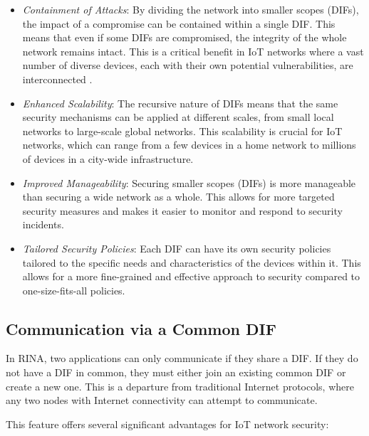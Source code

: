 \documentclass{ieeeaccess}
\begin{document}
\begin{itemize}
	\item \textit{Containment of Attacks}: By dividing the network into smaller scopes (DIFs), the impact of a compromise can be contained within a single DIF. This means that even if some DIFs are compromised, the integrity of the whole network remains intact. This is a critical benefit in IoT networks where a vast number of diverse devices, each with their own potential vulnerabilities, are interconnected \cite{day2008networking}.
	\item \textit{Enhanced Scalability}: The recursive nature of DIFs means that the same security mechanisms can be applied at different scales, from small local networks to large-scale global networks. This scalability is crucial for IoT networks, which can range from a few devices in a home network to millions of devices in a city-wide infrastructure.
	\item \textit{Improved Manageability}: Securing smaller scopes (DIFs) is more manageable than securing a wide network as a whole. This allows for more targeted security measures and makes it easier to monitor and respond to security incidents.
	\item \textit{Tailored Security Policies}: Each DIF can have its own security policies tailored to the specific needs and characteristics of the devices within it. This allows for a more fine-grained and effective approach to security compared to one-size-fits-all policies.
\end{itemize}

\subsection{Communication via a Common DIF}
In RINA, two applications can only communicate if they share a DIF. If they do not have a DIF in common, they must either join an existing common DIF or create a new one. This is a departure from traditional Internet protocols, where any two nodes with Internet connectivity can attempt to communicate.

This feature offers several significant advantages for IoT network security:
\end{document}
